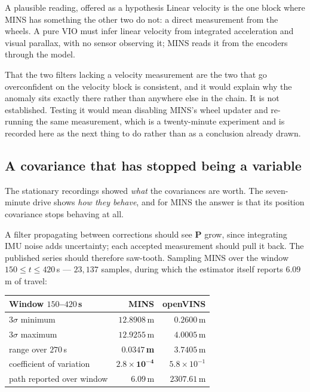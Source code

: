 \begin{trapbox}{A plausible reading, offered as a hypothesis}
Linear velocity is the one block where MINS has something the other two do
not: a direct measurement from the wheels. A pure VIO must infer linear
velocity from integrated acceleration and visual parallax, with no sensor
observing it; MINS reads it from the encoders through the
 model.

That the two filters lacking a velocity measurement are the two that go
overconfident on the velocity block is consistent, and it would explain why
the anomaly sits exactly there rather than anywhere else in the chain. It is
not established. Testing it would mean disabling MINS's wheel updater and
re-running the same measurement, which is a twenty-minute experiment and is
recorded here as the next thing to do rather than as a conclusion already
drawn.
\end{trapbox}

\subsection{A covariance that has stopped being a variable}
\label{sec:covsaturee}

The stationary recordings showed \emph{what} the covariances are worth. The
seven-minute drive shows \emph{how they behave}, and for MINS the answer is
that its position covariance stops behaving at all.

A filter propagating between corrections should see $\mathbf{P}$ grow, since
integrating IMU noise adds uncertainty; each accepted measurement should
pull it back. The published series should therefore saw-tooth. Sampling
MINS over the window $150 \le t \le 420$\,s --- $23{,}137$ samples, during
which the estimator itself reports $6.09$\,m of travel:

\begin{center}
\begin{tabular}{@{}lrr@{}}
\toprule
Window $150$--$420$\,s & MINS & openVINS \\
\midrule
$3\sigma$ minimum & $12.8908$\,m & $0.2600$\,m \\
$3\sigma$ maximum & $12.9255$\,m & $4.0005$\,m \\
range over $270$\,s & $\mathbf{0.0347}$\,\textbf{m} & $3.7405$\,m \\
coefficient of variation & $\mathbf{2.8\times10^{-4}}$ & $5.8\times10^{-1}$ \\
path reported over window & $6.09$\,m & $2307.61$\,m \\
\bottomrule
\end{tabular}
\end{center}

